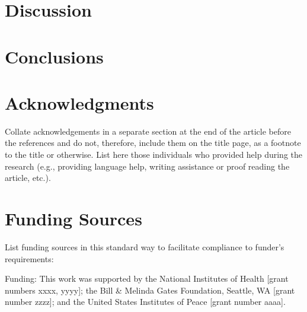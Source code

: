 \documentclass[preprint,review,12pt]{dependencies/elsarticle}
\begin{document}
\section{Discussion}
\label{sec:discussion}
%

\section{Conclusions}
\label{sec:conclusions}
%

\acresetall 
%
\section{Acknowledgments}
\label{sec:acknowledgments}
%
Collate acknowledgements in a separate section at the end of the article before the references and do not, therefore, include them on the title page, as a footnote to the title or otherwise.
List here those individuals who provided help during the research (e.g., providing language help, writing assistance or proof reading the article, etc.).
%
\section{Funding Sources}
\label{sec:funding_sources}
%
List funding sources in this standard way to facilitate compliance to funder's requirements:

Funding: This work was supported by the National Institutes of Health [grant numbers xxxx, yyyy]; the Bill \& Melinda Gates Foundation, Seattle, WA [grant number zzzz]; and the United States Institutes of Peace [grant number aaaa].
\end{document}
